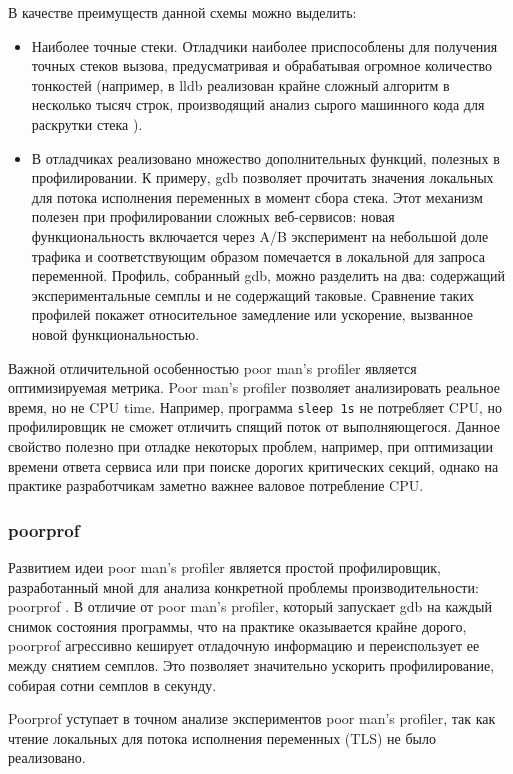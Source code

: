 В качестве преимуществ данной схемы можно выделить:
\begin{itemize}
    \item
        Наиболее точные стеки. Отладчики наиболее приспособлены для получения точных стеков вызова,
        предусматривая и обрабатывая огромное количество тонкостей (например, в lldb реализован
        крайне сложный алгоритм в несколько тысяч строк, производящий анализ сырого машинного кода для раскрутки стека \cite{lldb:asmcfi}).
    \item
        В отладчиках реализовано множество дополнительных функций, полезных в профилировании.
        К примеру, gdb позволяет прочитать значения локальных для потока исполнения переменных в момент сбора стека.
        Этот механизм полезен при профилировании сложных веб-сервисов: новая функциональность включается через A/B
        эксперимент на небольшой доле трафика и соответствующим образом помечается в локальной для запроса переменной.
        Профиль, собранный gdb, можно разделить на два: содержащий экспериментальные семплы и не содержащий таковые.
        Сравнение таких профилей покажет относительное замедление или ускорение, вызванное новой функциональностью.
\end{itemize}

Важной отличительной особенностью poor man's profiler является оптимизируемая метрика.
Poor man's profiler позволяет анализировать реальное время, но не CPU time.
Например, программа \verb!sleep 1s! не потребляет CPU, но профилировщик не сможет отличить спящий поток от выполняющегося.
Данное свойство полезно при отладке некоторых проблем, например, при оптимизации времени ответа сервиса или при поиске
дорогих критических секций, однако на практике разработчикам заметно важнее валовое потребление CPU.

\subsubsection{poorprof}
Развитием идеи poor man's profiler является простой профилировщик,
разработанный мной для анализа конкретной проблемы производительности: poorprof \cite{poorprof}.
В отличие от poor man's profiler, который запускает gdb на каждый снимок состояния программы,
что на практике оказывается крайне дорого, poorprof агрессивно кеширует отладочную информацию и переиспользует ее между снятием семплов.
Это позволяет значительно ускорить профилирование, собирая сотни семплов в секунду.

Poorprof уступает в точном анализе экспериментов poor man's profiler,
так как чтение локальных для потока исполнения переменных (TLS) не было реализовано.

